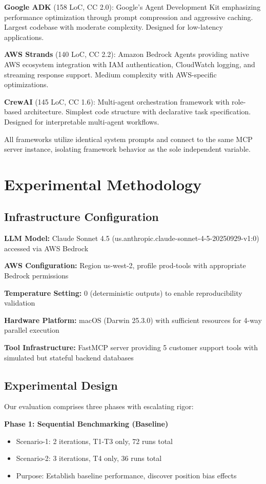 \documentclass[sigconf,nonacm]{acmart}
\begin{document}
\textbf{Google ADK} (158 LoC, CC 2.0): Google's Agent Development Kit emphasizing performance optimization through prompt compression and aggressive caching. Largest codebase with moderate complexity. Designed for low-latency applications.

\textbf{AWS Strands} (140 LoC, CC 2.2): Amazon Bedrock Agents providing native AWS ecosystem integration with IAM authentication, CloudWatch logging, and streaming response support. Medium complexity with AWS-specific optimizations.

\textbf{CrewAI} (145 LoC, CC 1.6): Multi-agent orchestration framework with role-based architecture. Simplest code structure with declarative task specification. Designed for interpretable multi-agent workflows.

All frameworks utilize identical system prompts and connect to the same MCP server instance, isolating framework behavior as the sole independent variable.

\section{Experimental Methodology}

\subsection{Infrastructure Configuration}

\textbf{LLM Model:} Claude Sonnet 4.5 (us.anthropic.claude-sonnet-4-5-20250929-v1:0) accessed via AWS Bedrock

\textbf{AWS Configuration:} Region us-west-2, profile prod-tools with appropriate Bedrock permissions

\textbf{Temperature Setting:} 0 (deterministic outputs) to enable reproducibility validation

\textbf{Hardware Platform:} macOS (Darwin 25.3.0) with sufficient resources for 4-way parallel execution

\textbf{Tool Infrastructure:} FastMCP server providing 5 customer support tools with simulated but stateful backend databases

\subsection{Experimental Design}

Our evaluation comprises three phases with escalating rigor:

\textbf{Phase 1: Sequential Benchmarking (Baseline)}
\begin{itemize}
\item Scenario-1: 2 iterations, T1-T3 only, 72 runs total
\item Scenario-2: 3 iterations, T4 only, 36 runs total
\item Purpose: Establish baseline performance, discover position bias effects
\end{itemize}
\end{document}
